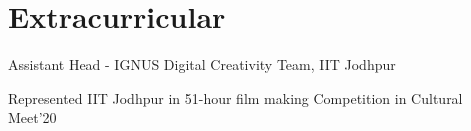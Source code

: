 \documentclass[]{deedy-resume-openfont}
\begin{document}
\begin{minipage}[t]{0.63\textwidth}

\section{Extracurricular}
\vspace{\topsep} %
\begin{tightemize}
\item Assistant Head - IGNUS Digital Creativity Team, IIT Jodhpur
\item Represented IIT Jodhpur in 51-hour film making Competition in Cultural Meet'20
\end{tightemize}

\end{minipage}
\end{document}
